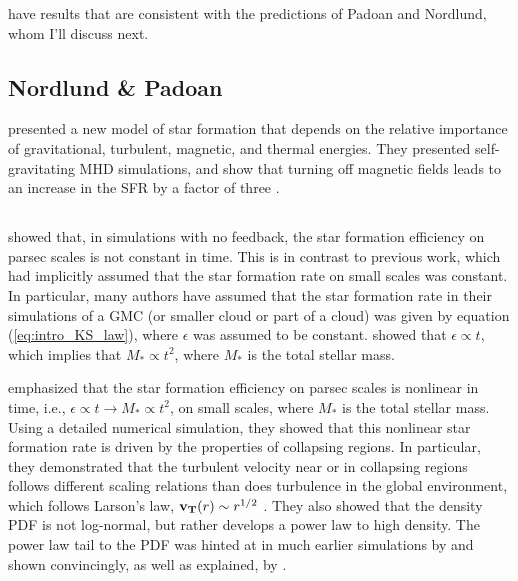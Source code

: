 \documentclass[../dissertation.tex]{subfiles}
\begin{document}
\citet{2004ApJ...605..800L} have results that are consistent with the predictions of Padoan and Nordlund, whom I'll discuss next.

\subsection{Nordlund \& Padoan}

\citet{2011ApJ...730...40P} presented a new model of star formation that depends on the relative importance of gravitational, turbulent, magnetic, and thermal energies.
They presented self-gravitating MHD simulations, and show that turning off magnetic fields leads to an increase in the SFR by a factor of three \citep{2011ApJ...730...40P}. 


\subsection{\citet{2015ApJ...800...49L}} \label{Lee15_model}

\citet{2015ApJ...800...49L} showed that, in simulations with no feedback, the star formation efficiency on
parsec scales is not constant in time.
This is in contrast to previous work, which had implicitly assumed that the star formation rate on small scales was constant.
In particular, many authors have assumed that the star formation rate in their simulations of a GMC (or smaller cloud or part of a cloud) was given by equation (\ref{eq:intro_KS_law}), where $\epsilon$ was assumed to be constant.
\citet{2015ApJ...800...49L} showed that $\epsilon \propto t$, which implies that $M_* \propto t^2$, where $M_*$ is the total stellar mass.

\citet{2015ApJ...800...49L} emphasized that the star formation efficiency on 
parsec scales is nonlinear 
in time, i.e., $\epsilon \propto t \rightarrow M_* \propto t^2$, on small scales, where $M_*$ is the total stellar mass. 
Using a detailed numerical simulation, they showed that this nonlinear star formation 
rate is driven by the properties of collapsing regions.
In particular, they demonstrated that the turbulent velocity near or in collapsing regions follows 
different scaling relations than does turbulence in the global environment, which follows
Larson's law, $\mathbf{v_T} (r)\sim r^{1/2}$ \citep{1981MNRAS.194..809L}. 
They also showed that the density PDF 
is not log-normal, but rather develops a power law to high density.
The power law tail to the  PDF  was hinted at in much earlier simulations by \citet{2000ApJ...535..869K} and shown convincingly, 
as well as explained, by \citet{2011ApJ...727L..20K}. 
\end{document}
